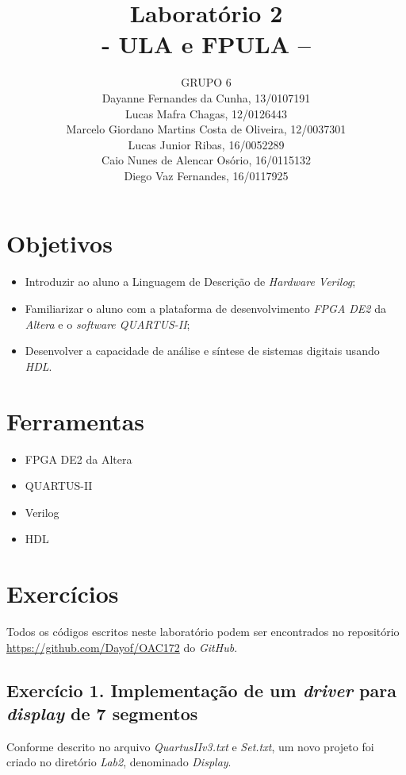 \documentclass[12pt]{article}
\title{Laboratório 2\\- ULA e FPULA –}
\author{GRUPO 6\\
	Dayanne Fernandes da Cunha, 13/0107191\\
	Lucas Mafra Chagas, 12/0126443\\
	Marcelo Giordano Martins Costa de Oliveira, 12/0037301\\
	Lucas Junior Ribas, 16/0052289\\
	Caio Nunes de Alencar Osório, 16/0115132\\
	Diego Vaz Fernandes, 16/0117925}
\begin{document}
\maketitle

\section{Objetivos}
\label{sec:Objetivos}

\begin{itemize}
\item Introduzir ao aluno a Linguagem de Descrição de \textit{Hardware Verilog};
\item Familiarizar o aluno com a plataforma de desenvolvimento \textit{FPGA DE2} da \textit{Altera} e o \textit{software QUARTUS-II};
\item Desenvolver a capacidade de análise e síntese de sistemas digitais usando \textit{HDL}.
\end{itemize}

\section{Ferramentas}
\label{sec:Materiais}

\begin{itemize}
\item FPGA DE2 da Altera 
\item QUARTUS-II
\item Verilog
\item HDL
\end{itemize}

\section{Exercícios}
\label{sec:exercicios}

Todos os códigos escritos neste laboratório podem ser encontrados no repositório \url{https://github.com/Dayof/OAC172} do \textit{GitHub}.

\subsection{Exercício 1. Implementação de um \textit{driver} para \textit{display} de 7 segmentos}
\label{subsec:1driver}

Conforme descrito no arquivo \textit{QuartusIIv3.txt} e \textit{Set.txt}, um novo projeto foi criado no diretório \textit{Lab2}, denominado \textit{Display}. 
\end{document}
